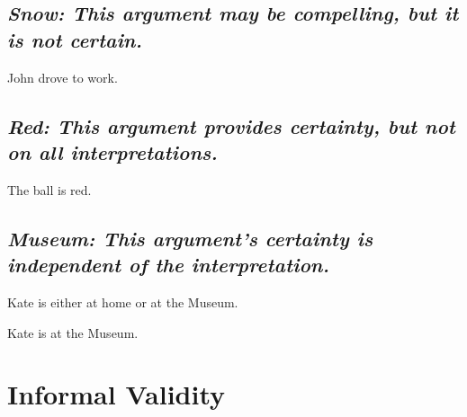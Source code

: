 \documentclass[a4paper, 11pt]{article} %
\begin{document}
\subsection*{\it \textbf{Snow}: This argument may be compelling, but it is not certain.}

\begin{earg}
  \item John drove to work.
\end{earg}


\subsection*{\it \textbf{Red}: This argument provides certainty, but not on all interpretations.}

\begin{earg}
  \item The ball is red.
\end{earg}


\subsection*{\it \textbf{Museum}: This argument's certainty is independent of the interpretation.}

\begin{earg}
  \item Kate is either at home or at the Museum.
  \item Kate is at the Museum.
\end{earg}





\section*{Informal Validity}
\end{document}
